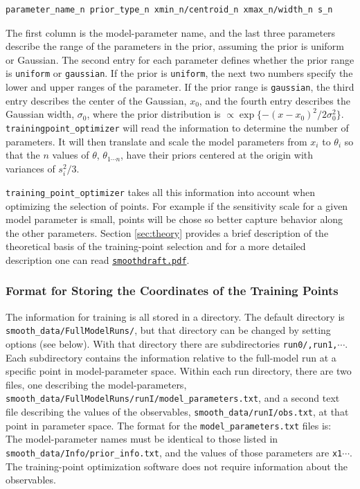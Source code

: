 \documentclass[UserManual.tex]{subfiles}
\begin{document}
\begin{sloppypar}
{{\begin{Verbatim}[commandchars=\\\{\}]
   parameter_name_n prior_type_n xmin_n/centroid_n xmax_n/width_n s_n

\end{Verbatim}
}\vspace*{-8pt}
}
The first column is the model-parameter name, and the last three parameters describe the range of the parameters in the prior, assuming the prior is uniform or Gaussian. The second entry for each parameter defines whether the prior range is {\tt uniform} or {\tt gaussian}. If the prior is {\tt uniform}, the next two numbers specify the lower and upper ranges of the parameter. If the prior range is {\tt gaussian}, the third entry describes the center of the Gaussian, $x_0$, and the fourth entry describes the Gaussian width, $\sigma_0$, where the prior distribution is $\propto \exp\{-(x-x_0)^2/2\sigma_0^2\}$. {\tt trainingpoint\_optimizer} will read the information to determine the number of parameters. It will then translate and scale the model parameters from $x_i$ to $\theta_i$ so that the $n$ values of $\theta$, $\theta_{1\cdots n}$, have their priors centered at the origin with variances of $s_i^2/3$. 

{\tt training\_point\_optimizer} takes all this information into account when optimizing the selection of points. For example if the sensitivity scale for a given model parameter is small, points will be chose so better capture behavior along the other parameters. Section \ref{sec:theory} provides a brief description of the theoretical basis of the training-point selection and for a more detailed description one can read \href{./smoothdraft.pdf}{{\tt smoothdraft.pdf}}.

\subsubsection{Format for Storing the Coordinates of the Training Points}
The information for training is all stored in a directory. The default directory is {{\tt smooth\_data/FullModelRuns/}}, but that directory can be changed by setting options (see below). With that directory there are subdirectories {\tt run0/,run1,}$\cdots$. Each subdirectory contains the information relative to the full-model run at a specific point in model-parameter space. Within each run directory, there are two files, one describing the model-parameters, {\tt smooth\_data/FullModelRuns/runI/model\_parameters.txt}, and a second text file describing the values of the observables, {\tt smooth\_data/runI/obs.txt}, at that point in parameter space. The format for the {\tt model\_parameters.txt} files is:
{\tt
\vspace*{-8pt}{\tt \begin{Verbatim}[commandchars=\\\{\}]
parameter_name_1 x1  
parameter_name_2 x2  
.
\end{Verbatim}
}\vspace*{-8pt}}
The model-parameter names must be identical to those listed in {\tt smooth\_data/Info/prior\_info.txt}, and the values of those parameters are {\tt x1}$\cdots$. The training-point optimization software does not require information about the observables.


\end{sloppypar}
\end{document}
